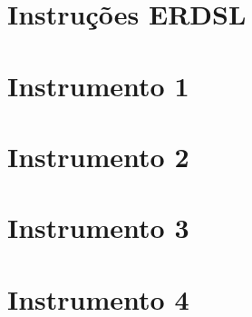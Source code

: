 \begin{apendicesenv}
\section{Instruções ERDSL} \label{ap:StepERDSLExp}
    \begin{figure}
        \centering
         
    \end{figure}
\newpage
\section{Instrumento 1} \label{ap:Inst1Exp}
    \begin{figure}
        \centering
         
    \end{figure}
\newpage
\section{Instrumento 2} \label{ap:Inst2Exp}
    \begin{figure}
        \centering
         
    \end{figure}
\newpage
\section{Instrumento 3} \label{ap:Inst3Exp}
    \begin{figure}
        \centering
         
    \end{figure}
\newpage
\section{Instrumento 4} \label{ap:Inst4Exp}
    \begin{figure}
        \centering
         
    \end{figure}
\newpage






\end{apendicesenv}
